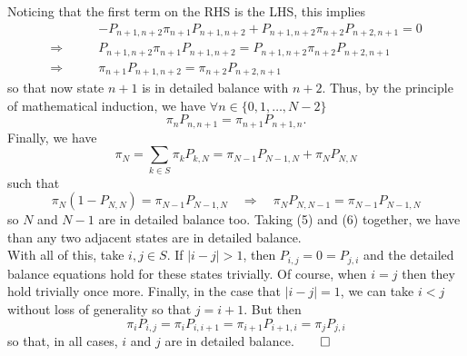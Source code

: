 \documentclass[11pt, letterpaper]{article}
\begin{document}
    Noticing that the first term on the RHS is the LHS, this implies
    \begin{align*}
        &-P_{n+1,n+2}\pi_{n+1}P_{n+1,n+2}+P_{n+1,n+2}\pi_{n+2}P_{n+2,n+1}=0\\
        \Rightarrow\qquad&P_{n+1,n+2}\pi_{n+1}P_{n+1,n+2}=P_{n+1,n+2}\pi_{n+2}P_{n+2,n+1}\\
        \Rightarrow\qquad&\pi_{n+1}P_{n+1,n+2}=\pi_{n+2}P_{n+2,n+1}
    \end{align*}
    so that now state $n+1$ is in detailed balance with $n+2$. Thus, by the principle of mathematical induction, we have $\forall n\in\{0,1,\dots,N-2\}$
    \[\pi_nP_{n,n+1}=\pi_{n+1}P_{n+1,n}.\tag{5}\] 
    Finally, we have
    \[\pi_N=\sum_{k\in S}\pi_k P_{k,N}=\pi_{N-1}P_{N-1,N}+\pi_N P_{N,N}\]
    such that
    \[\pi_N(1-P_{N,N})=\pi_{N-1}P_{N-1,N}\quad\Rightarrow\quad \pi_NP_{N,N-1}=\pi_{N-1}P_{N-1,N}\tag{6}\]
    so $N$ and $N-1$ are in detailed balance too. Taking (5) and (6) together, we have than any two adjacent states are in detailed balance.\\[10pt]
    With all of this, take $i,j\in S$. If $|i-j|>1$, then $P_{i,j}=0=P_{j,i}$ and the detailed balance equations hold for these states trivially.
    Of course, when $i=j$ then they hold trivially once more. Finally, in the case that $|i-j|=1$, we can take $i<j$ without loss of generality so that $j=i+1$. But then
    \[\pi_iP_{i,j}=\pi_iP_{i,i+1}=\pi_{i+1}P_{i+1,i}=\pi_jP_{j,i}\]
    so that, in all cases, $i$ and $j$ are in detailed balance.\hfill{$\qed$}
\end{document}
